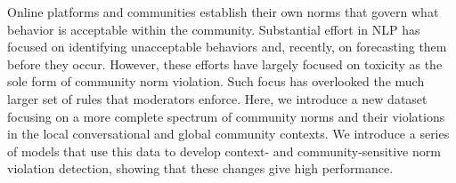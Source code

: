 Online platforms and communities establish their own norms that govern what behavior is acceptable within the community. Substantial effort in NLP has focused on identifying unacceptable behaviors and, recently, on forecasting them before they occur. However, these efforts have largely focused on toxicity as the sole form of community norm violation. Such focus has overlooked the much larger set of rules that moderators enforce. Here, we introduce a new dataset focusing on a more complete spectrum of community norms and their violations in the local conversational and global community contexts. We introduce a series of models that use this data to develop context- and community-sensitive norm violation detection, showing that these changes give high performance.
